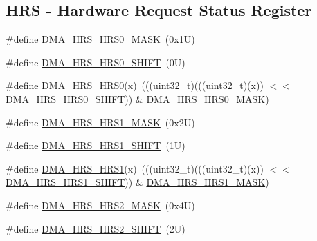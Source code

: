 \subsection*{H\+RS -\/ Hardware Request Status Register}
\begin{DoxyCompactItemize}
\item 
\#define \mbox{\hyperlink{group___d_m_a___register___masks_ga39ace553ace4ea0f1da0f2e418ea1cc7}{D\+M\+A\+\_\+\+H\+R\+S\+\_\+\+H\+R\+S0\+\_\+\+M\+A\+SK}}~(0x1\+U)
\item 
\#define \mbox{\hyperlink{group___d_m_a___register___masks_ga68978d004a9c81063869d7d59553f3e9}{D\+M\+A\+\_\+\+H\+R\+S\+\_\+\+H\+R\+S0\+\_\+\+S\+H\+I\+FT}}~(0\+U)
\item 
\#define \mbox{\hyperlink{group___d_m_a___register___masks_gace83a59e5cbcd17430edf2764d3926de}{D\+M\+A\+\_\+\+H\+R\+S\+\_\+\+H\+R\+S0}}(x)~(((uint32\+\_\+t)(((uint32\+\_\+t)(x)) $<$$<$ \mbox{\hyperlink{group___d_m_a___register___masks_ga68978d004a9c81063869d7d59553f3e9}{D\+M\+A\+\_\+\+H\+R\+S\+\_\+\+H\+R\+S0\+\_\+\+S\+H\+I\+FT}})) \& \mbox{\hyperlink{group___d_m_a___register___masks_ga39ace553ace4ea0f1da0f2e418ea1cc7}{D\+M\+A\+\_\+\+H\+R\+S\+\_\+\+H\+R\+S0\+\_\+\+M\+A\+SK}})
\item 
\#define \mbox{\hyperlink{group___d_m_a___register___masks_ga260c7de3089f87d08b58f8c2874dcb2a}{D\+M\+A\+\_\+\+H\+R\+S\+\_\+\+H\+R\+S1\+\_\+\+M\+A\+SK}}~(0x2\+U)
\item 
\#define \mbox{\hyperlink{group___d_m_a___register___masks_ga33181a585c24a5532e4756d6f7080a74}{D\+M\+A\+\_\+\+H\+R\+S\+\_\+\+H\+R\+S1\+\_\+\+S\+H\+I\+FT}}~(1\+U)
\item 
\#define \mbox{\hyperlink{group___d_m_a___register___masks_ga863ae3ddb412303755f11c03db95a99c}{D\+M\+A\+\_\+\+H\+R\+S\+\_\+\+H\+R\+S1}}(x)~(((uint32\+\_\+t)(((uint32\+\_\+t)(x)) $<$$<$ \mbox{\hyperlink{group___d_m_a___register___masks_ga33181a585c24a5532e4756d6f7080a74}{D\+M\+A\+\_\+\+H\+R\+S\+\_\+\+H\+R\+S1\+\_\+\+S\+H\+I\+FT}})) \& \mbox{\hyperlink{group___d_m_a___register___masks_ga260c7de3089f87d08b58f8c2874dcb2a}{D\+M\+A\+\_\+\+H\+R\+S\+\_\+\+H\+R\+S1\+\_\+\+M\+A\+SK}})
\item 
\#define \mbox{\hyperlink{group___d_m_a___register___masks_gaab172f0aec10459f57a424abf8218201}{D\+M\+A\+\_\+\+H\+R\+S\+\_\+\+H\+R\+S2\+\_\+\+M\+A\+SK}}~(0x4\+U)
\item 
\#define \mbox{\hyperlink{group___d_m_a___register___masks_ga5ce6312c610677e9fd618e58cf5db4be}{D\+M\+A\+\_\+\+H\+R\+S\+\_\+\+H\+R\+S2\+\_\+\+S\+H\+I\+FT}}~(2\+U)
\item 

\end{DoxyCompactItemize}
